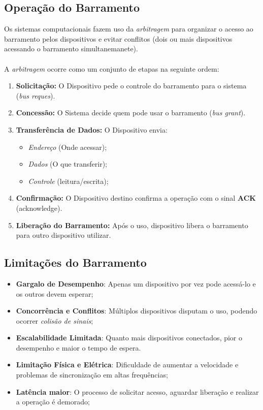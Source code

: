 \documentclass{article}
\begin{document}
\subsection{Operação do Barramento}
Os sistemas computacionais fazem uso da \textit{arbitragem} para organizar o acesso ao barramento pelos dispositivos e evitar conflitos (dois ou mais dispositivos acessando o barramento simultanemanete). \\ \\
A \textit{arbitragem} ocorre como um conjunto de etapas na seguinte ordem:
\begin{enumerate}
    \item \textbf{Solicitação:} O Dispositivo pede o controle do barramento para o sistema (\emph{bus reques}).
    \item \textbf{Concessão:} O Sistema decide quem pode usar o barramento (\emph{bus grant}).

    \item \textbf{Transferência de Dados:} O Dispositivo envia:
        \begin{itemize}
            \item \textit{Endereço} (Onde acessar);
            \item \textit{Dados} (O que transferir);
            \item \textit{Controle} (leitura/escrita);
        \end{itemize}

    \item \textbf{Confirmação:} O Dispositivo destino confirma a operação com o sinal \textbf{ACK} (acknowledge).
    \item \textbf{Liberação do Barramento:} Após o uso, dispositivo libera o barramento para outro dispositivo utilizar.
\end{enumerate}

\subsection{Limitações do Barramento}
\begin{itemize}
    \item \textbf{Gargalo de Desempenho}: Apenas um dispositivo por vez pode acessá-lo e os outros devem esperar;
    \item \textbf{Concorrência e Conflitos}: Múltiplos dispositivos disputam o uso, podendo ocorrer \textit{colisão de sinais};
    \item \textbf{Escalabilidade Limitada}: Quanto mais dispositivos conectados, pior o desempenho e maior o tempo de espera.
    \item \textbf{Limitação Física e Elétrica}: Dificuldade de aumentar a velocidade e problemas de sincronização em altas frequências;
    \item \textbf{Latência maior}: O processo de solicitar acesso, aguardar liberação e realizar a operação é demorado;
\end{itemize}
\end{document}
